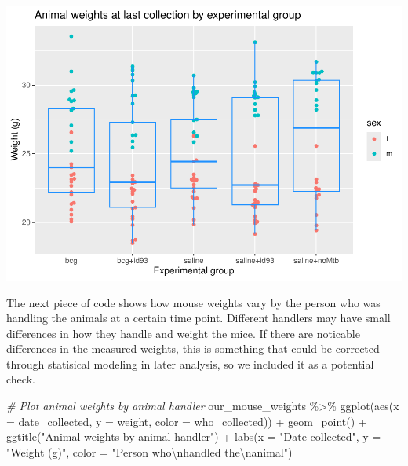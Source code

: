 \documentclass[
]{book}
\newenvironment{Shaded}{\begin{snugshade}}{\end{snugshade}}
\newcommand{\AttributeTok}[1]{\textcolor[rgb]{0.77,0.63,0.00}{#1}}
\newcommand{\CommentTok}[1]{\textcolor[rgb]{0.56,0.35,0.01}{\textit{#1}}}
\newcommand{\FunctionTok}[1]{\textcolor[rgb]{0.00,0.00,0.00}{#1}}
\newcommand{\NormalTok}[1]{#1}
\newcommand{\SpecialCharTok}[1]{\textcolor[rgb]{0.00,0.00,0.00}{#1}}
\newcommand{\StringTok}[1]{\textcolor[rgb]{0.31,0.60,0.02}{#1}}
\begin{document}
\includegraphics{csu-impactb_files/figure-latex/unnamed-chunk-16-1.pdf}

The next piece of code shows how mouse weights vary by the person who was
handling the animals at a certain time point. Different handlers may have small
differences in how they handle and weight the mice. If there are noticable
differences in the measured weights, this is something that could be corrected
through statisical modeling in later analysis, so we included it as a potential
check.

\begin{Shaded}
\begin{Highlighting}[]
\CommentTok{\# Plot animal weights by animal handler}
\NormalTok{our\_mouse\_weights }\SpecialCharTok{\%\textgreater{}\%} 
  \FunctionTok{ggplot}\NormalTok{(}\FunctionTok{aes}\NormalTok{(}\AttributeTok{x =}\NormalTok{ date\_collected, }\AttributeTok{y =}\NormalTok{ weight, }\AttributeTok{color =}\NormalTok{ who\_collected)) }\SpecialCharTok{+} 
  \FunctionTok{geom\_point}\NormalTok{() }\SpecialCharTok{+} 
  \FunctionTok{ggtitle}\NormalTok{(}\StringTok{"Animal weights by animal handler"}\NormalTok{) }\SpecialCharTok{+} 
  \FunctionTok{labs}\NormalTok{(}\AttributeTok{x =} \StringTok{"Date collected"}\NormalTok{, }
       \AttributeTok{y =} \StringTok{"Weight (g)"}\NormalTok{,}
       \AttributeTok{color =} \StringTok{"Person who}\SpecialCharTok{\textbackslash{}n}\StringTok{handled the}\SpecialCharTok{\textbackslash{}n}\StringTok{animal"}\NormalTok{)}
\end{Highlighting}
\end{Shaded}
\end{document}
